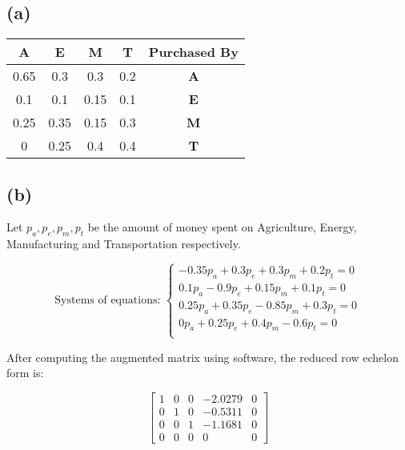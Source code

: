\documentclass[12pt, a4paper]{article}
\begin{document}
\subsection*{(a)}

\begin{table}[h!]
    \begin{tabular}{ c c c c | c }
   \hline
    \textbf{A} & \textbf{E} & \textbf{M} & \textbf{T} & \textbf{Purchased By} \\
   \hline
    0.65 & 0.3 & 0.3 & 0.2 & \textbf{A} \\
   0.1 & 0.1 & 0.15 & 0.1 & \textbf{E} \\
   0.25 & 0.35 & 0.15 & 0.3 & \textbf{M} \\
   0 & 0.25 & 0.4 & 0.4 & \textbf{T} \\
   \hline
    \end{tabular}
\end{table}

\subsection*{(b)}

Let $p_a, p_e, p_m, p_t$ be the amount of money spent on Agriculture, Energy, Manufacturing and Transportation respectively.

\[
    \text{Systems of equations: } \begin{cases}
        -0.35p_a + 0.3p_e + 0.3p_m + 0.2p_t = 0 \\
        0.1p_a - 0.9p_e + 0.15p_m + 0.1p_t = 0 \\
        0.25p_a + 0.35p_e - 0.85p_m + 0.3p_t = 0 \\
        0p_a + 0.25p_e + 0.4p_m - 0.6p_t = 0 \\
    \end{cases}
\]

After computing the augmented matrix using software, the reduced row echelon form is:


\[
    \begin{bmatrix}
        1 & 0 & 0 & -2.0279 & 0 \\
        0 & 1 & 0 & -0.5311 & 0 \\
        0 & 0 & 1 & -1.1681 & 0 \\
        0 & 0 & 0 & 0 & 0
    \end{bmatrix}
\]
\end{document}

